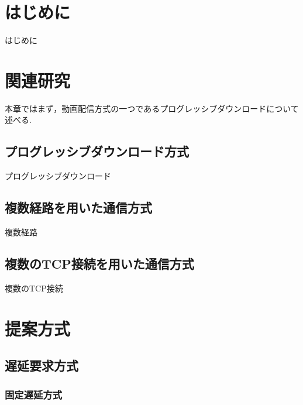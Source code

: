 \documentclass[a4j,12pt]{gradthesis_utf8}
\begin{document}
 
\maketitle %

\chapter{はじめに}\label{sec:sec1}
はじめに

\chapter{関連研究}\label{sec:sec2}
本章ではまず，動画配信方式の一つであるプログレッシブダウンロードについて述べる.

\section{プログレッシブダウンロード方式}
プログレッシブダウンロード

 \section{複数経路を用いた通信方式}
 複数経路

 \section{複数のTCP接続を用いた通信方式}
 複数のTCP接続
 
\chapter{提案方式}\label{sec:sec3}
\section{遅延要求方式}
\subsection{固定遅延方式}
\end{document}
